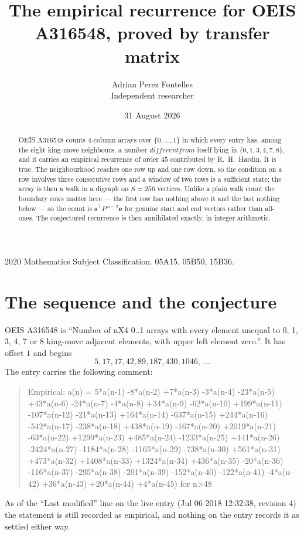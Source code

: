 \documentclass[11pt,a4paper]{article}
\title{The empirical recurrence for OEIS A316548, proved by transfer matrix}
\author{Adrian Perez Fontelles\\ \small Independent researcher}
\date{31 August 2026}
\theoremstyle{plain}
\theoremstyle{definition}
\begin{document}
\maketitle

\begin{abstract}
OEIS A316548 counts $4$-column arrays over $\{0,\dots,1\}$ in which every entry has,
among the eight king-move neighbours, a number $different from$ itself lying in $\{0,1,3,4,7,8\}$, and it carries an empirical
recurrence of order $45$ contributed by R.~H.~Hardin. It is true. The neighbourhood
reaches one row up and one row down, so the condition on a row involves three consecutive
rows and a window of two rows is a sufficient state; the array is then a walk in a digraph
on $S=256$ vertices. Unlike a plain walk count the boundary rows matter here --- the first
row has nothing above it and the last nothing below --- so the count is
$\mathbf{s}^{\!\top}P^{\,n-2}\mathbf{e}$ for genuine start and end vectors rather than
all-ones. The conjectured recurrence is then annihilated exactly, in integer arithmetic.
\end{abstract}

\noindent\small 2020 Mathematics Subject Classification. 05A15, 05B50, 15B36.\normalsize

\section{The sequence and the conjecture}

OEIS A316548 is ``Number of nX4 0..1 arrays with every element unequal to 0, 1, 3, 4, 7 or 8 king-move adjacent elements, with upper left element zero.''. It has offset
$1$ and begins
\[
5, 17, 17, 42, 89, 187, 430, 1046,\ \dots
\]
The entry carries the following comment:
\begin{quote}\small
Empirical: a(n) = 5*a(n-1) -8*a(n-2) +7*a(n-3) -3*a(n-4) -23*a(n-5) +43*a(n-6) -24*a(n-7) -4*a(n-8) +34*a(n-9) -62*a(n-10) +199*a(n-11) -107*a(n-12) -21*a(n-13) +164*a(n-14) -637*a(n-15) +244*a(n-16) -542*a(n-17) -238*a(n-18) +438*a(n-19) -167*a(n-20) +2019*a(n-21) -63*a(n-22) +1299*a(n-23) +485*a(n-24) -1233*a(n-25) +141*a(n-26) -2424*a(n-27) -1184*a(n-28) -1165*a(n-29) -738*a(n-30) +561*a(n-31) +473*a(n-32) +1408*a(n-33) +1324*a(n-34) +436*a(n-35) -20*a(n-36) -116*a(n-37) -295*a(n-38) -201*a(n-39) -152*a(n-40) -122*a(n-41) -4*a(n-42) +36*a(n-43) +20*a(n-44) +4*a(n-45) for n>48
\end{quote}
As of the ``Last modified'' line on the live entry (Jul 06 2018 12:32:38, revision
4) the statement is still recorded as empirical, and nothing on the entry
records it as settled either way.
\end{document}
